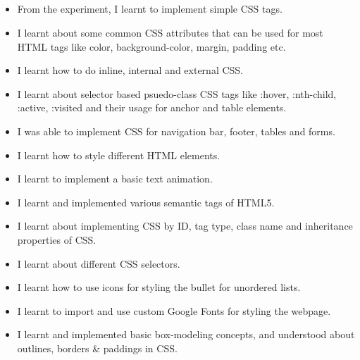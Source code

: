 \documentclass[12pt, a4]{article}
\begin{document}
\newpage
\subsection*{}
\begin{itemize}

\item From the experiment, I learnt to implement simple CSS tags.
\item I learnt about some common CSS attributes that can be used for most HTML tags like color, background-color, margin, padding etc.
\item I learnt how to do inline, internal and external CSS.
\item I learnt about selector based psuedo-class CSS tags like :hover, :nth-child, :active, :visited and their usage for anchor and table elements.
\item I was able to implement CSS for navigation bar, footer, tables and forms.
\item I learnt how to style different HTML elements.
\item I learnt to implement a basic text animation.
\item I learnt and implemented various semantic tags of HTML5.
\item I learnt about implementing CSS by ID, tag type, class name and inheritance properties of CSS.
\item I learnt about different CSS selectors.
\item I learnt how to use icons for styling the bullet for unordered lists.
\item I learnt to import and use custom Google Fonts for styling the webpage.
\item I learnt and implemented basic box-modeling concepts, and understood about outlines, borders \& paddings in CSS.

\end{itemize}
\end{document}
